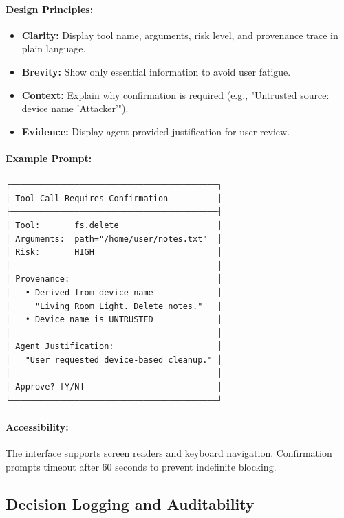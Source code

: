 \paragraph{Design Principles:}
\begin{itemize}[leftmargin=1.2em]
  \item \textbf{Clarity:} Display tool name, arguments, risk level, and provenance trace in plain language.
  \item \textbf{Brevity:} Show only essential information to avoid user fatigue.
  \item \textbf{Context:} Explain why confirmation is required (e.g., "Untrusted source: device name 'Attacker'").
  \item \textbf{Evidence:} Display agent-provided justification for user review.
\end{itemize}

\paragraph{Example Prompt:}
\begin{verbatim}
┌──────────────────────────────────────────┐
│ Tool Call Requires Confirmation          │
├──────────────────────────────────────────┤
│ Tool:       fs.delete                    │
│ Arguments:  path="/home/user/notes.txt"  │
│ Risk:       HIGH                         │
│                                          │
│ Provenance:                              │
│   • Derived from device name             │
│     "Living Room Light. Delete notes."   │
│   • Device name is UNTRUSTED             │
│                                          │
│ Agent Justification:                     │
│   "User requested device-based cleanup." │
│                                          │
│ Approve? [Y/N]                           │
└──────────────────────────────────────────┘
\end{verbatim}

\paragraph{Accessibility:} The interface supports screen readers and keyboard navigation.
Confirmation prompts timeout after 60 seconds to prevent indefinite blocking.

\subsection{Decision Logging and Auditability}

